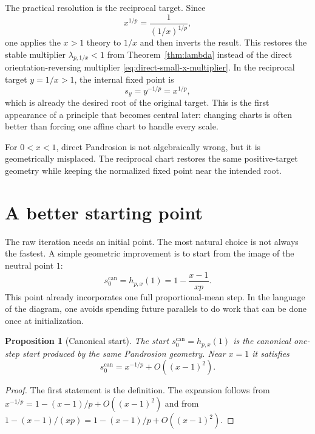 \documentclass[10pt,a4paper]{article}
\theoremstyle{plain}
\newtheorem{proposition}[theorem]{Proposition}
\theoremstyle{definition}
\theoremstyle{remark}
\newcommand{\hp}{h_{p,x}}
\newenvironment{takeaway}{%
  \begin{center}\begin{minipage}{0.92\linewidth}\small\itshape\color{blue!45!black}%
}{%
  \end{minipage}\end{center}%
}
\begin{document}
The practical resolution is the reciprocal target.  Since
\[
  x^{1/p}=\frac{1}{(1/x)^{1/p}},
\]
one applies the $x>1$ theory to $1/x$ and then inverts the result.  This
restores the stable multiplier $\lambda_{p,1/x}<1$ from
Theorem~\ref{thm:lambda} instead of the direct orientation-reversing multiplier
\eqref{eq:direct-small-x-multiplier}.  In the reciprocal target $y=1/x>1$, the
internal fixed point is
\[
  s_y=y^{-1/p}=x^{1/p},
\]
which is already the desired root of the original target.  This is the first
appearance of a principle that becomes central later: changing charts is often
better than forcing one affine chart to handle every scale.

\begin{takeaway}
For $0<x<1$, direct Pandrosion is not algebraically wrong, but it is
geometrically misplaced.  The reciprocal chart restores the same positive-target
geometry while keeping the normalized fixed point near the intended root.
\end{takeaway}

\section{A better starting point}
\label{sec:start}

The raw iteration needs an initial point.  The most natural choice is not
always the fastest.  A simple geometric improvement is to start from the image
of the neutral point $1$:
\begin{equation}
  s_0^{\mathrm{can}}=\hp(1)=1-\frac{x-1}{xp}.
  \label{eq:startcan}
\end{equation}
This point already incorporates one full proportional-mean step.  In the
language of the diagram, one avoids spending future parallels to do work that
can be done once at initialization.

\begin{proposition}[Canonical start]
The start $s_0^{\mathrm{can}}=\hp(1)$ is the canonical one-step start produced
by the same Pandrosion geometry.  Near $x=1$ it satisfies
\[
  s_0^{\mathrm{can}}=x^{-1/p}+O((x-1)^2).
\]
\end{proposition}

\begin{proof}
The first statement is the definition.  The expansion follows from
$x^{-1/p}=1-(x-1)/p+O((x-1)^2)$ and from
$1-(x-1)/(xp)=1-(x-1)/p+O((x-1)^2)$.
\end{proof}
\end{document}
